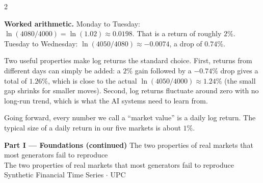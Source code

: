 \documentclass[10pt]{article}
\newcommand{\pagehead}[2]{%
  \begin{tcolorbox}[enhanced,arc=0pt,outer arc=0pt,boxrule=0pt,
    colback=Navy,colframe=Navy,
    top=5pt,bottom=5pt,left=8pt,right=8pt,
    before skip=0pt,after skip=10pt]
  {\color{white}\large\bfseries #1}%
  \ifx\relax#2\relax\else\\[1pt]{\color{blue!30!white}\small #2}\fi
  \hfill{\color{blue!20!white}\footnotesize Synthetic Financial Time Series $\cdot$ UPC}
  \end{tcolorbox}}
\begin{document}
\begin{multicols}{2}
{\textbf{Worked arithmetic.} Monday to Tuesday: $\ln(4080/4000) = \ln(1.02) \approx 0.0198$. That is a return of roughly $2\%$. Tuesday to Wednesday: $\ln(4050/4080) \approx -0.0074$, a drop of $0.74\%$.

Two useful properties make log returns the standard choice.
First, returns from different days can simply be added: a $2\%$ gain followed by a $-0.74\%$ drop gives a total of $1.26\%$, which is close to the actual $\ln(4050/4000) \approx 1.24\%$ (the small gap shrinks for smaller moves).
Second, log returns fluctuate around zero with no long-run trend, which is what the AI systems need to learn from.

\smallskip
Going forward, every number we call a ``market value'' is a daily log return. The typical size of a daily return in our five markets is about $1\%$.}

\end{multicols}

\clearpage

\pagehead{Part I --- Foundations (continued)}
         {The two properties of real markets that most generators fail to reproduce}
\end{document}
